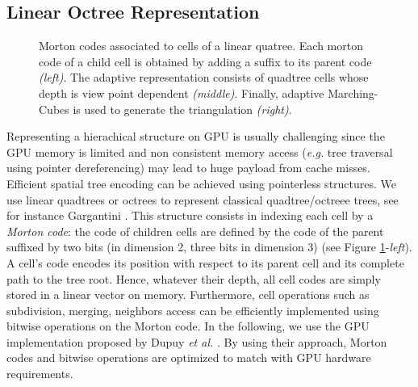 \documentclass{llncs}
\begin{document}
\subsection{Linear Octree Representation}

\begin{figure}[!htbp]
  \begin{center}
  \end{center}
\caption{Morton codes associated to cells of a linear quatree. Each
   morton code of a child cell is obtained by adding a suffix to its
  parent code \emph{(left)}. The adaptive representation consists of
  quadtree cells whose depth is view point dependent
  \emph{(middle)}. Finally, adaptive Marching-Cubes is used to
  generate the triangulation \emph{(right)}.}
\label{fig_quadtree_partitionning}
\end{figure}

Representing a hierachical structure on GPU is usually challenging
since the GPU memory is limited and non consistent 
memory access (\emph{e.g.} tree traversal using pointer dereferencing)
may lead to huge payload from cache misses.  Efficient spatial tree
encoding can be achieved using pointerless structures. We use
linear quadtrees or octrees to represent classical quadtree/octreee
trees, see for instance Gargantini
\cite{gargantini1982effective}. This structure consists in indexing
each cell by a \emph{Morton code}: the code of children cells are
defined by the code of the parent suffixed by two bits (in dimension
2, three bits in dimension 3) (see Figure
\ref{fig_quadtree_partitionning}-\emph{left}). A cell's code encodes
 its position with respect to its parent cell and its
complete path to the tree root. Hence, whatever their depth, all cell
codes are simply stored in a linear vector on memory. Furthermore,
cell operations such as subdivision, merging, neighbors access can be
efficiently implemented using bitwise operations on the Morton code.
In the following, we use the GPU implementation proposed by Dupuy
\textit{et al.}  \cite{dupuy2014quadtrees}. By using their approach, Morton
codes and bitwise operations are optimized to match with GPU hardware
requirements.
\end{document}
